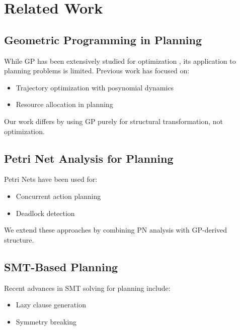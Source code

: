 \documentclass[11pt]{article}
\begin{document}

\section{Related Work}

\subsection{Geometric Programming in Planning}

While GP has been extensively studied for optimization
\cite{boyd2007tutorial}, its application to planning problems is
limited. Previous work has focused on:

\begin{itemize}
    \item Trajectory optimization with posynomial dynamics \cite{trajectory2018}
    \item Resource allocation in planning \cite{resource2019}
\end{itemize}

Our work differs by using GP purely for structural transformation, not optimization.

\subsection{Petri Net Analysis for Planning}

Petri Nets have been used for:
\begin{itemize}
    \item Concurrent action planning \cite{concurrent2020}
    \item Deadlock detection \cite{deadlock2021}
\end{itemize}

We extend these approaches by combining PN analysis with GP-derived structure.

\subsection{SMT-Based Planning}

Recent advances in SMT solving for planning include:
\begin{itemize}
    \item Lazy clause generation \cite{lazy2022}
    \item Symmetry breaking \cite{symmetry2023}
\end{itemize}
\end{document}
